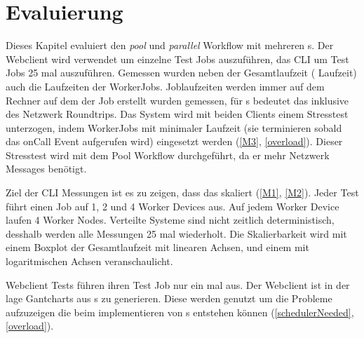 
\chapter{Evaluierung}
\label{K7}

Dieses Kapitel evaluiert den \textit{pool} und \textit{parallel} Workflow mit mehreren \jobScript s.
Der Webclient wird verwendet um einzelne Test Jobs auszuführen, das CLI um Test Jobs 25 mal auszuführen.
Gemessen wurden neben der Gesamtlaufzeit (\RootJob{} Laufzeit) auch die Laufzeiten der WorkerJobs.
Joblaufzeiten werden immer auf dem Rechner auf dem der Job erstellt wurden gemessen, für \remoteJob s bedeutet das inklusive des Netzwerk Roundtrips.
Das System wird mit beiden Clients einem Stresstest unterzogen, indem WorkerJobs mit minimaler Laufzeit (sie terminieren sobald das onCall Event aufgerufen wird) eingesetzt werden (\ref{M3}, \ref{overload}).
Dieser Stresstest wird mit dem Pool Workflow durchgeführt, da er mehr Netzwerk Messages benötigt.

Ziel der CLI Messungen ist es zu zeigen, dass das \jobScript{} skaliert (\ref{M1}, \ref{M2}).
Jeder Test führt einen Job auf 1, 2 und 4 Worker Devices aus. Auf jedem Worker Device laufen 4 Worker Nodes.
Verteilte Systeme sind nicht zeitlich deterministisch, desshalb werden alle Messungen 25 mal wiederholt.
Die Skalierbarkeit wird mit einem Boxplot der Gesamtlaufzeit mit linearen Achsen, und einem mit logaritmischen Achsen veranschaulicht.

Webclient Tests führen ihren Test Job nur ein mal aus.
Der Webclient ist in der lage Gantcharts aus \JobTree s zu generieren.
Diese werden genutzt um die Probleme aufzuzeigen die beim implementieren von \jobScript s entstehen können (\ref{schedulerNeeded}, \ref{overload}).


